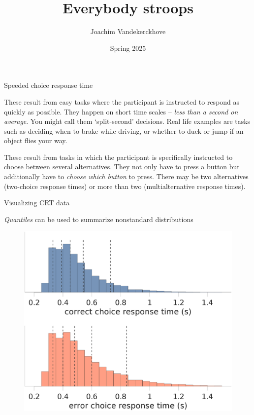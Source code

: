 \documentclass[aspectratio=169]{beamer}
\title{Everybody stroops}
\author{Joachim Vandekerckhove}
\date{Spring 2025}
\begin{document}
\maketitle

\begin{frame}[fragile]{Speeded choice response time}

These result from easy tasks where the participant is instructed to respond as quickly as possible.  They happen on short time scales -- \emph{less than a second on average}.  You might call them `split-second' decisions.  Real life examples are tasks such as deciding when to brake while driving, or whether to duck or jump if an object flies your way.
\xe\pause

These result from tasks in which the participant is specifically instructed to choose between several alternatives.  They not only have to press a button but additionally have to \emph{choose which button} to press.  There may be two alternatives (two-choice response times) or more than two (multialternative response times).
\xe

\end{frame}



\begin{frame}[fragile]{Visualizing CRT data}

\emph{Quantiles} can be used to summarize nonstandard distributions\\[2ex]\pause

\begin{figure}[htp]
\centering
\includegraphics[scale=0.18]{rtdist6}
\end{figure}

\end{frame}
\end{document}

